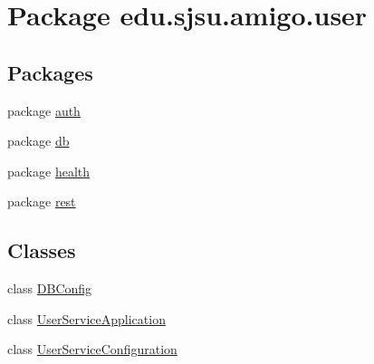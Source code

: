 \hypertarget{namespaceedu_1_1sjsu_1_1amigo_1_1user}{}\section{Package edu.\+sjsu.\+amigo.\+user}
\label{namespaceedu_1_1sjsu_1_1amigo_1_1user}
\subsection*{Packages}
\begin{DoxyCompactItemize}
\item 
package \hyperlink{namespaceedu_1_1sjsu_1_1amigo_1_1user_1_1auth}{auth}
\item 
package \hyperlink{namespaceedu_1_1sjsu_1_1amigo_1_1user_1_1db}{db}
\item 
package \hyperlink{namespaceedu_1_1sjsu_1_1amigo_1_1user_1_1health}{health}
\item 
package \hyperlink{namespaceedu_1_1sjsu_1_1amigo_1_1user_1_1rest}{rest}
\end{DoxyCompactItemize}
\subsection*{Classes}
\begin{DoxyCompactItemize}
\item 
class \hyperlink{classedu_1_1sjsu_1_1amigo_1_1user_1_1_d_b_config}{D\+B\+Config}
\item 
class \hyperlink{classedu_1_1sjsu_1_1amigo_1_1user_1_1_user_service_application}{User\+Service\+Application}
\item 
class \hyperlink{classedu_1_1sjsu_1_1amigo_1_1user_1_1_user_service_configuration}{User\+Service\+Configuration}
\end{DoxyCompactItemize}
